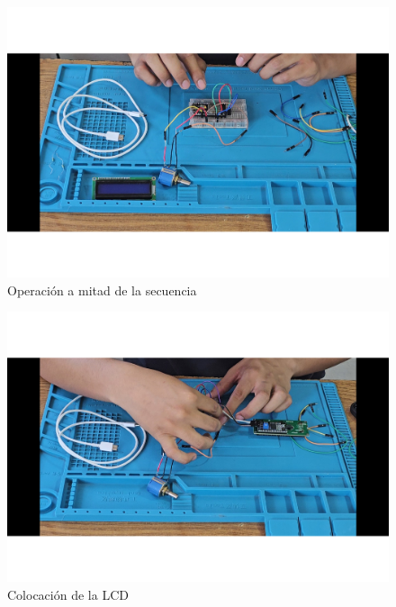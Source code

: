      \begin{figure}[H]
        \centering
        \includegraphics[trim =  {25mm 25mm 25mm 10mm},clip,scale=0.3]{22/Img/e5.pdf}
        \caption{Operación a mitad de la secuencia}
        \label{fig:evi2}
    \end{figure}
    
    
    \begin{figure}[H]
        \centering
        \includegraphics[trim =  {25mm 25mm 25mm 10mm},clip,scale=0.3]{22/Img/e8.pdf}
        \caption{Colocación de la LCD}
        \label{fig:evi3}
    \end{figure}
    
